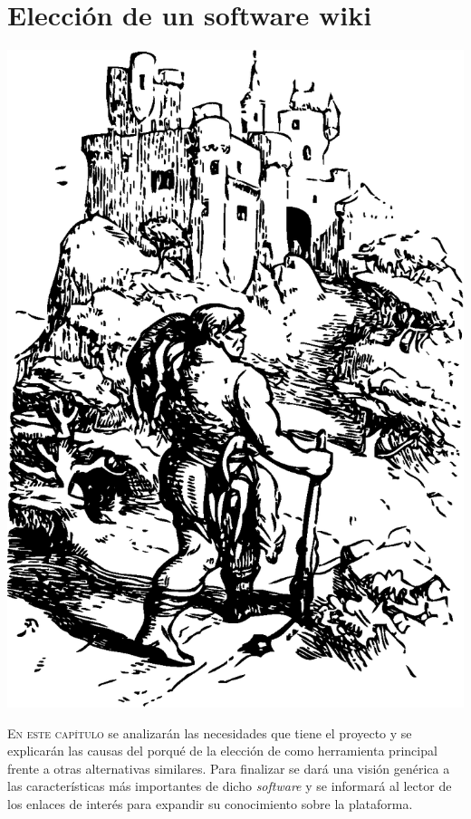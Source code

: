 \chapter{Elección de un software wiki}
\label{chapter:eleccion-software-wiki}

\begin{center}
\includegraphics[scale=0.4]{../graphics/johnny_automatic_giant_going_to_castle.eps}
\end{center}

\lettrine{E}{n este capítulo} se analizarán las necesidades que tiene el proyecto \alma{} y se explicarán las causas del porqué de la elección de \tiki{} como herramienta principal frente a otras alternativas similares. Para finalizar se dará una visión genérica a las características más importantes de dicho \textit{software} y se informará al lector de los enlaces de interés para expandir su conocimiento sobre la plataforma.

